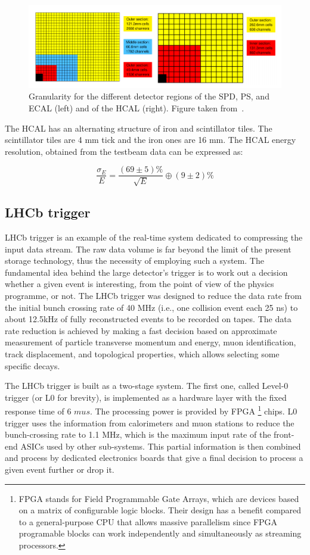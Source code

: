 \begin{figure}
\centering
\includegraphics[width=\linewidth]{figures/ECAL.PNG}
\caption{Granularity for the different detector regions of the SPD, PS, and ECAL (left)
and of the HCAL (right). Figure taken from~\cite{lhcb}.
\label{fig:ECAL}}
\end{figure}

The HCAL has an alternating structure of iron and scintillator tiles. The scintillator tiles are 4 mm tick and the iron ones are 16 mm. The HCAL energy resolution, obtained from the testbeam data can be expressed as: 

\begin{equation}
    \frac{\sigma_E}{E} = \frac{(69\pm 5) \%}{\sqrt{E}} \oplus (9\pm 2) \%
\end{equation}
 
\subsection{LHCb trigger}
\label{sec:trigger}
LHCb trigger is an example of the real-time system dedicated to compressing the input data stream. The raw data volume is far beyond the limit of the present storage technology, thus the necessity of employing such a system. The fundamental idea behind the large detector's trigger is to work out a decision whether a given event is interesting, from the point of view of the physics programme, or not. The LHCb trigger was designed to reduce the data rate from the initial bunch crossing rate of 40 MHz (i.e., one collision event each 25 ns) to about 12.5kHz of fully reconstructed events to be recorded on tapes. The data rate reduction is achieved by making a fast decision based on approximate measurement of particle transverse momentum and energy, muon identification, track displacement, and topological properties, which allows selecting some specific decays. 

The LHCb trigger is built as a two-stage system. The first one, called Level-0 trigger (or L0 for brevity), is implemented as a hardware layer with the fixed response time of 6 $mu s$. The processing power is provided by FPGA \footnote{FPGA stands for Field Programmable Gate Arrays, which are devices based on a matrix of configurable logic blocks. Their design has a benefit compared to a general-purpose CPU that allows massive parallelism since FPGA programable blocks can work independently and simultaneously as streaming processors.} chips. L0 trigger uses the information from calorimeters and muon stations to reduce the bunch-crossing rate to 1.1 MHz, which is the maximum input rate of the front-end ASICs used by other sub-systems. This partial information is then combined and process by dedicated electronics boards that give a final decision to process a given event further or drop it. 

